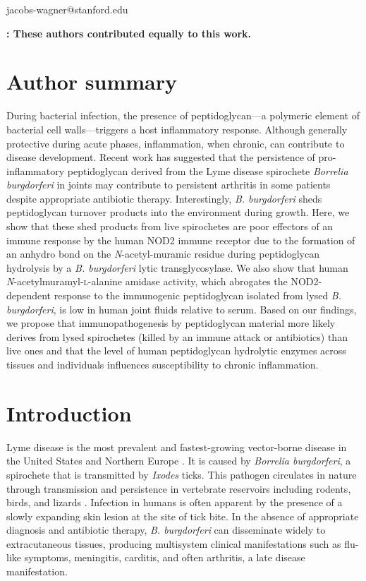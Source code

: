 \documentclass[twoside, watermark]{zHenriquesLab-StyleBioRxiv}
\newcommand{\scl}{\textsc{l}} %
\begin{document}
\begin{corrauthor}
jacobs-wagner@stanford.edu
\end{corrauthor}

\vspace{-1.5mm}
{\scriptsize \textbf{: These authors contributed equally to this work.}}

\section*{Author summary}
During bacterial infection, the presence of peptidoglycan—a polymeric element of bacterial cell walls—triggers a host inflammatory response. Although generally protective during acute phases, inflammation, when chronic, can contribute to disease development. Recent work has suggested that the persistence of pro-inflammatory peptidoglycan derived from the Lyme disease spirochete \textit{Borrelia burgdorferi} in joints may contribute to persistent arthritis in some patients despite appropriate antibiotic therapy. Interestingly, \textit{B. burgdorferi} sheds peptidoglycan turnover products into the environment during growth. Here, we show that these shed products from live spirochetes are poor effectors of an immune response by the human NOD2 immune receptor due to the formation of an anhydro bond on the \textit{N}-acetyl-muramic residue during peptidoglycan hydrolysis by a \textit{B. burgdorferi} lytic transglycosylase. We also show that human \textit{N}-acetylmuramyl-\scl -alanine amidase activity, which abrogates the NOD2-dependent response to the immunogenic peptidoglycan isolated from lysed \textit{B. burgdorferi}, is low in human joint fluids relative to serum. Based on our findings, we propose that immunopathogenesis by peptidoglycan material more likely derives from lysed spirochetes (killed by an immune attack or antibiotics) than live ones and that the level of human peptidoglycan hydrolytic enzymes across tissues and individuals influences susceptibility to chronic inflammation.

\section*{Introduction}
Lyme disease is the most prevalent and fastest-growing vector-borne disease in the United States and Northern Europe \cite{Kugeler2024,Mead2015,Mead2021,Pustijanac2024}. It is caused by \textit{Borrelia burgdorferi}, a spirochete that is transmitted by \textit{Ixodes} ticks. This pathogen circulates in nature through transmission and persistence in vertebrate reservoirs including rodents, birds, and lizards \cite{Radolf2012}. Infection in humans is often apparent by the presence of a slowly expanding skin lesion at the site of tick bite. In the absence of appropriate diagnosis and antibiotic therapy, \textit{B. burgdorferi} can disseminate widely to extracutaneous tissues, producing multisystem clinical manifestations such as flu-like symptoms, meningitis, carditis, and often arthritis, a late disease manifestation.
\end{document}
